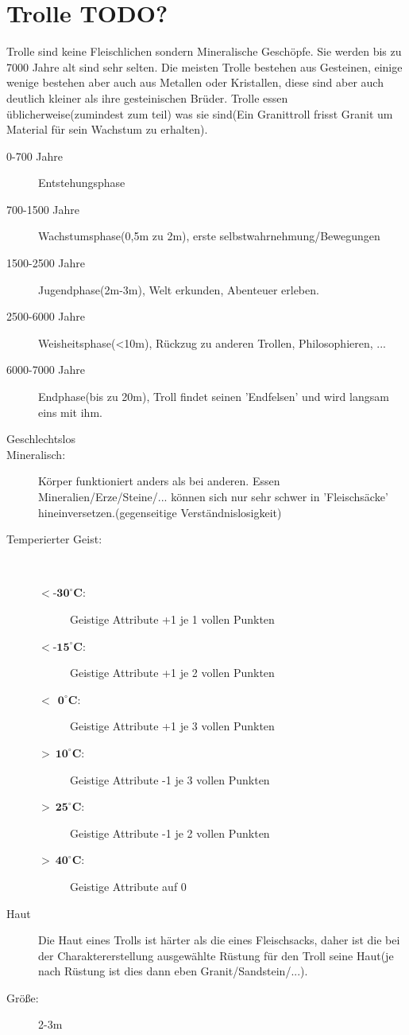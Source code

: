 \section{Trolle TODO?}
Trolle sind keine Fleischlichen sondern Mineralische Geschöpfe. Sie werden bis zu 7000 Jahre alt sind sehr selten. Die meisten Trolle bestehen aus Gesteinen, einige wenige bestehen aber auch aus Metallen oder Kristallen, diese sind aber auch deutlich kleiner als ihre gesteinischen Brüder. Trolle essen üblicherweise(zumindest zum teil) was sie sind(Ein Granittroll frisst Granit um Material für sein Wachstum zu erhalten).
\begin{description}
	\item [0-700 Jahre] Entstehungsphase
	\item [700-1500 Jahre] Wachstumsphase(0,5m zu 2m), erste selbstwahrnehmung/Bewegungen
	\item [1500-2500 Jahre] Jugendphase(2m-3m), Welt erkunden, Abenteuer erleben. 
	\item [2500-6000 Jahre] Weisheitsphase(<10m), Rückzug zu anderen Trollen, Philosophieren, ...
	\item [6000-7000 Jahre] Endphase(bis zu 20m), Troll findet seinen 'Endfelsen' und wird langsam eins mit ihm.
	\item [Geschlechtslos]
	\item [Mineralisch:] Körper funktioniert anders als bei anderen. Essen Mineralien/Erze/Steine/... können sich nur sehr schwer in 'Fleischsäcke' hineinversetzen.(gegenseitige Verständnislosigkeit)
	\item[Temperierter Geist:]\ 
	\begin{description}
	\item [$\bm{<\text{-}30^\circ C}$:] Geistige Attribute +1 je 1 vollen Punkten
	\item [$\bm{<\text{-}15^\circ C}$:] Geistige Attribute +1 je 2 vollen Punkten
	\item [$\bm{<\ \ 0^\circ C}$:] Geistige Attribute +1 je 3 vollen Punkten
	\item [$\bm{>\ 10^\circ C}$:] Geistige Attribute -1 je 3 vollen Punkten
	\item [$\bm{>\ 25^\circ C}$:] Geistige Attribute -1 je 2 vollen Punkten
	\item [$\bm{>\ 40^\circ C}$:] Geistige Attribute auf 0
	\end{description}
	\item [Haut] Die Haut eines Trolls ist härter als die eines Fleischsacks, daher ist die bei der Charaktererstellung ausgewählte Rüstung für den Troll seine Haut(je nach Rüstung ist dies dann eben Granit/Sandstein/...).
	\item[Größe:] 2-3m
\end{description}

